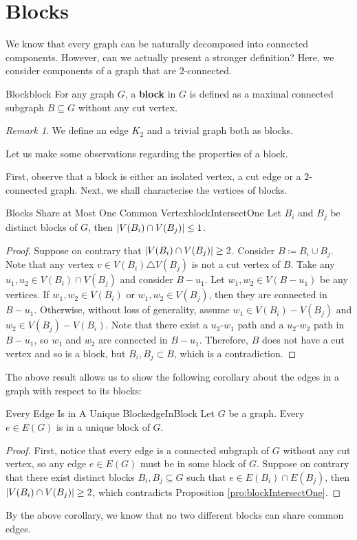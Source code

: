 \documentclass[math]{amznotes}
\theoremstyle{remark}
\newtheorem*{remark}{Remark}
\newcommand{\0}{\mathbf{0}}
\newcommand{\1}{\mathbf{1}}
\begin{document}
\section{Blocks}
We know that every graph can be naturally decomposed into connected components. However, can we actually present a stronger definition? Here, we consider components of a graph that are $2$-connected.
\begin{dfnbox}{Block}{block}
    For any graph $G$, a {\color{red} \textbf{block}} in $G$ is defined as a maximal connected subgraph $B \subseteq G$ without any cut vertex.
\end{dfnbox}
\begin{notebox}
    \begin{remark}
        We define an edge $K_2$ and a trivial graph both as blocks.
    \end{remark}
\end{notebox}
Let us make some observations regarding the properties of a block.

First, observe that a block is either an isolated vertex, a cut edge or a $2$-connected graph. Next, we shall characterise the vertices of blocks.
\begin{probox}{Blocks Share at Most One Common Vertex}{blockIntersectOne}
    Let $B_i$ and $B_j$ be distinct blocks of $G$, then ${\left\lvert {V(B_i) \cap V(B_j)} \right\rvert} \leq 1$.
    \tcblower
    \begin{proof}
        Suppose on contrary that ${\left\lvert {V(B_i) \cap V(B_j)} \right\rvert} \geq 2$. Consider $B \coloneqq B_i \cup B_j$. Note that any vertex $v \in V(B_i) \triangle V(B_j)$ is not a cut vertex of $B$. Take any $u_1, u_2 \in V(B_i) \cap V(B_j)$ and consider $B - u_1$. Let $w_1, w_2 \in V(B - u_1)$ be any vertices. If $w_1, w_2 \in V(B_i)$ or $w_1, w_2 \in V(B_j)$, then they are connected in $B - u_1$. Otherwise, without loss of generality, assume $w_1 \in V(B_i) - V(B_j)$ and $w_2 \in V(B_j) - V(B_i)$. Note that there exist a $u_2$-$w_1$ path and a $u_2$-$w_2$ path in $B - u_1$, so $w_1$ and $w_2$ are connected in $B - u_1$. Therefore, $B$ does not have a cut vertex and so is a block, but $B_i, B_j \subset B$, which is a contradiction.
    \end{proof}
\end{probox}
The above result allows us to show the following corollary about the edges in a graph with respect to its blocks:
\begin{corbox}{Every Edge Is in A Unique Block}{edgeInBlock}
    Let $G$ be a graph. Every $e \in E(G)$ is in a unique block of $G$.
    \tcblower
    \begin{proof}
        First, notice that every edge is a connected subgraph of $G$ without any cut vertex, so any edge $e \in E(G)$ must be in some block of $G$. Suppose on contrary that there exist distinct blocks $B_i, B_j \subseteq G$ such that $e \in E(B_i) \cap E(B_j)$, then ${\left\lvert {V(B_i) \cap V(B_j)} \right\rvert} \geq 2$, which contradicts Proposition \ref{pro:blockIntersectOne}.
    \end{proof}
\end{corbox}
By the above corollary, we know that no two different blocks can share common edges.
\end{document}
